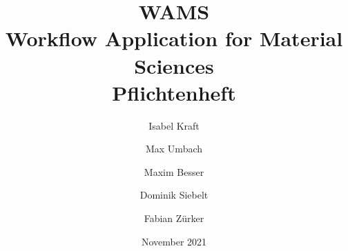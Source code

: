 \documentclass[paper=a4, fontsize = 12pt, DIV = calc, twoside=off, parskip=full, numbers=noenddot]{scrbook}
\title{{WAMS}\\
{\Large{Workflow Application for Material Sciences}}\\
{Pflichtenheft}}
\author{Isabel Kraft \and Max Umbach 
        \and Maxim Besser \and Dominik Siebelt \and Fabian Zürker}
\date{November 2021}
\begin{document}
\maketitle

\newpage
\tableofcontents
\newpage















\printglossary
\end{document}
